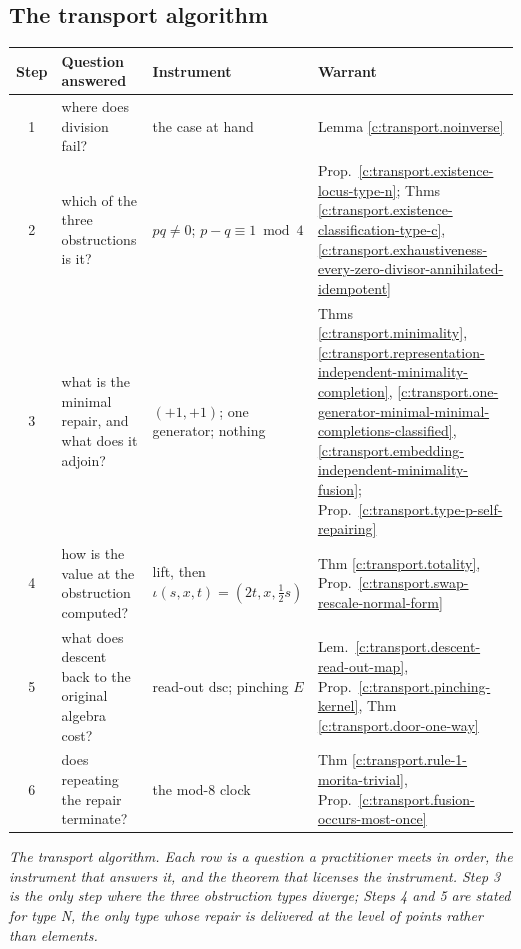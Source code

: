\documentclass[11pt]{article}
\theoremstyle{definition}
\theoremstyle{plain}
\providecommand{\dsc}{}\renewcommand{\dsc}{\mathrm{dsc}}
\begin{document}
\subsection*{The transport algorithm}
\label{c:note.transport.setting-transport-algorithm}
\begin{tabular}{c>{ \arraybackslash}p{3.5cm}>{ \arraybackslash}p{4.1cm}>{ \arraybackslash}p{4.3cm}}
\toprule
Step & Question answered & Instrument & Warrant \\
\midrule
1 & where does division fail? & the case at hand & Lemma \ref{c:transport.noinverse} \\
2 & which of the three obstructions is it? & $pq \neq 0$; $p - q \equiv 1 \bmod 4$ & Prop.\ \ref{c:transport.existence-locus-type-n}; Thms \ref{c:transport.existence-classification-type-c}, \ref{c:transport.exhaustiveness-every-zero-divisor-annihilated-idempotent} \\
3 & what is the minimal repair, and what does it adjoin? & $(+1,+1)$; one generator; nothing & Thms \ref{c:transport.minimality}, \ref{c:transport.representation-independent-minimality-completion}, \ref{c:transport.one-generator-minimal-minimal-completions-classified}, \ref{c:transport.embedding-independent-minimality-fusion}; Prop.\ \ref{c:transport.type-p-self-repairing} \\
4 & how is the value at the obstruction computed? & lift, then $\iota(s,x,t) = (2t,x,\tfrac12 s)$ & Thm \ref{c:transport.totality}, Prop.\ \ref{c:transport.swap-rescale-normal-form} \\
5 & what does descent back to the original algebra cost? & read-out $\dsc$; pinching $E$ & Lem.\ \ref{c:transport.descent-read-out-map}, Prop.\ \ref{c:transport.pinching-kernel}, Thm \ref{c:transport.door-one-way} \\
6 & does repeating the repair terminate? & the mod-8 clock & Thm \ref{c:transport.rule-1-morita-trivial}, Prop.\ \ref{c:transport.fusion-occurs-most-once} \\
\bottomrule
\end{tabular}

\emph{The transport algorithm. Each row is a question a practitioner meets in order, the instrument that answers it, and the theorem that licenses the instrument. Step 3 is the only step where the three obstruction types diverge; Steps 4 and 5 are stated for type N, the only type whose repair is delivered at the level of points rather than elements.}
\end{document}
